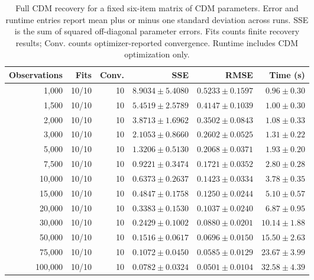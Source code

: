 \begin{table}
\caption{Full CDM recovery for a fixed six-item matrix of CDM parameters. Error and runtime entries report mean plus or minus one standard deviation across runs. SSE is the sum of squared off-diagonal parameter errors. Fits counts finite recovery results; Conv. counts optimizer-reported convergence. Runtime includes CDM optimization only.}
\label{tab:paper-synthetic-recovery}
\begin{tabular}{rrrrrr}
\toprule
Observations & Fits & Conv. & SSE & RMSE & Time (s) \\
\midrule
1,000 & 10/10 & 10 & $8.9034 \pm 5.4080$ & $0.5233 \pm 0.1597$ & $0.96 \pm 0.30$ \\
1,500 & 10/10 & 10 & $5.4519 \pm 2.5789$ & $0.4147 \pm 0.1039$ & $1.00 \pm 0.30$ \\
2,000 & 10/10 & 10 & $3.8713 \pm 1.6962$ & $0.3502 \pm 0.0843$ & $1.08 \pm 0.33$ \\
3,000 & 10/10 & 10 & $2.1053 \pm 0.8660$ & $0.2602 \pm 0.0525$ & $1.31 \pm 0.22$ \\
5,000 & 10/10 & 10 & $1.3206 \pm 0.5130$ & $0.2068 \pm 0.0371$ & $1.93 \pm 0.20$ \\
7,500 & 10/10 & 10 & $0.9221 \pm 0.3474$ & $0.1721 \pm 0.0352$ & $2.80 \pm 0.28$ \\
10,000 & 10/10 & 10 & $0.6373 \pm 0.2637$ & $0.1423 \pm 0.0334$ & $3.78 \pm 0.35$ \\
15,000 & 10/10 & 10 & $0.4847 \pm 0.1758$ & $0.1250 \pm 0.0244$ & $5.10 \pm 0.57$ \\
20,000 & 10/10 & 10 & $0.3383 \pm 0.1530$ & $0.1037 \pm 0.0240$ & $6.87 \pm 0.95$ \\
30,000 & 10/10 & 10 & $0.2429 \pm 0.1002$ & $0.0880 \pm 0.0201$ & $10.14 \pm 1.88$ \\
50,000 & 10/10 & 10 & $0.1516 \pm 0.0617$ & $0.0696 \pm 0.0150$ & $15.50 \pm 2.63$ \\
75,000 & 10/10 & 10 & $0.1072 \pm 0.0450$ & $0.0585 \pm 0.0129$ & $23.67 \pm 3.99$ \\
100,000 & 10/10 & 10 & $0.0782 \pm 0.0324$ & $0.0501 \pm 0.0104$ & $32.58 \pm 4.39$ \\
\bottomrule
\end{tabular}
\end{table}
